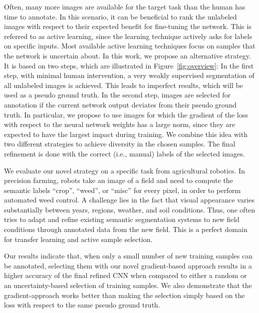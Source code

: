 Often, many more images are available for the target task than the human has time to annotate. In this scenario, it can be beneficial to rank the unlabeled images with respect to their expected benefit for fine-tuning the network. This is referred to as active learning, since the learning technique actively asks for labels on specific inputs. Most available active learning techniques focus on samples that the network is uncertain about. In this work, we propose an alternative strategy. It is based on two steps, which are illustrated in Figure~\ref{fig:overview}: In the first step, with minimal human intervention, a very weakly supervised segmentation of all unlabeled images is achieved. This leads to imperfect results, which will be used as a pseudo ground truth. In the second step, images are selected for annotation if the current network output deviates from their pseudo ground truth. In particular, we propose to use images for which the gradient of the loss with respect to the neural network weights has a large norm, since they are expected to have the largest impact during training. We combine this idea with two different strategies to achieve diversity in the chosen samples. The final refinement is done with the correct (i.e., manual) labels of the selected images.

We evaluate our novel strategy on a specific task from agricultural robotics. In precision farming, robots take an image of a field and  need to compute the semantic labels ``crop'', ``weed'',  or ``misc'' for every pixel, in order to perform automated weed control. A challenge lies in the fact that visual appearance varies substantially between years, regions, weather, and soil conditions. Thus, one often tries to adapt and refine existing semantic segmentation systems to new field conditions through annotated data from the new field. This is a perfect domain for transfer learning and active sample selection.

Our results indicate that, when only a small number of new training samples can be annotated, selecting them with our novel gradient-based approach results in a higher accuracy of the final refined CNN when compared to either a random or an uncertainty-based selection of training samples. We also demonstrate that the gradient-approach works better than making the selection simply based on the loss with respect to the same pseudo ground truth.



